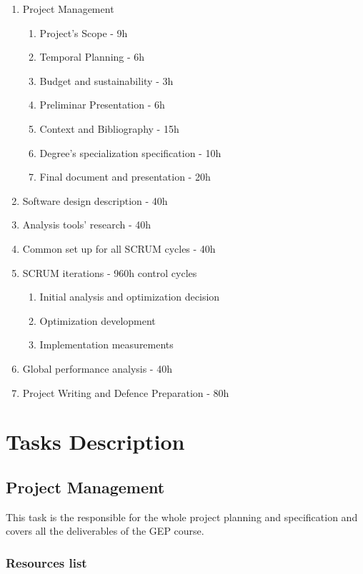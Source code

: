 \begin{enumerate}
\item Project Management
\begin{enumerate}
\item Project's Scope - 9h
\item Temporal Planning - 6h
\item Budget and sustainability - 3h
\item Preliminar Presentation - 6h
\item Context and Bibliography - 15h
\item Degree's specialization specification - 10h
\item Final document and presentation - 20h
\end{enumerate}
\item Software design description - 40h
\item Analysis tools' research - 40h
\item Common set up for all SCRUM cycles - 40h
\item SCRUM iterations - 960h control cycles
\begin{enumerate}
\item Initial analysis and optimization decision
\item Optimization development
\item Implementation measurements
\end{enumerate}
\item Global performance analysis - 40h

\item Project Writing and Defence Preparation - 80h
\end{enumerate}

\section{Tasks Description}


\subsection{Project Management}

This task is the responsible for the whole project planning and specification and covers all the deliverables of the GEP course. 

\subsubsection{Resources list}

